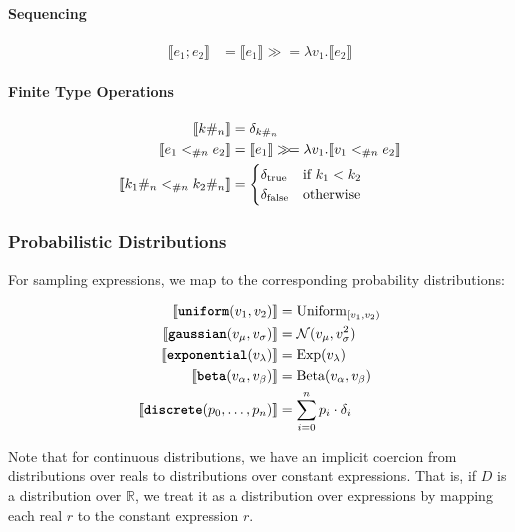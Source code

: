 \paragraph{Sequencing}
\begin{align*}
\llbracket e_1; e_2 \rrbracket &= \llbracket e_1 \rrbracket \gg\!= \lambda v_1. \llbracket e_2 \rrbracket
\end{align*}

\paragraph{Finite Type Operations}
\begin{align*}
\llbracket k\#_{n} \rrbracket &= \delta_{k\#_{n}} \\
\llbracket e_1 <_{\#{n}} e_2 \rrbracket &= \llbracket e_1 \rrbracket \gg\!= \lambda v_1. \llbracket v_1 <_{\#{n}} e_2 \rrbracket \\
\llbracket k_1\#_{n} <_{\#{n}} k_2\#_{n} \rrbracket &= \begin{cases}
    \delta_{\text{true}} & \text{if } k_1 < k_2 \\
    \delta_{\text{false}} & \text{otherwise}
\end{cases}
\end{align*}

\subsubsection{Probabilistic Distributions}

For sampling expressions, we map to the corresponding probability distributions:

\begin{align*}
\llbracket \text{\ttfamily\bfseries uniform}(v_1, v_2) \rrbracket &= \text{Uniform}_{[v_1, v_2)} \\
\llbracket \text{\ttfamily\bfseries gaussian}(v_\mu, v_\sigma) \rrbracket &= \mathcal{N}(v_\mu, v_\sigma^2) \\
\llbracket \text{\ttfamily\bfseries exponential}(v_\lambda) \rrbracket &= \text{Exp}(v_\lambda) \\
\llbracket \text{\ttfamily\bfseries beta}(v_\alpha, v_\beta) \rrbracket &= \text{Beta}(v_\alpha, v_\beta) \\
\llbracket \text{\ttfamily\bfseries discrete}(p_0, \ldots, p_n) \rrbracket &= \sum_{i=0}^n p_i \cdot \delta_i
\end{align*}

Note that for continuous distributions, we have an implicit coercion from distributions over reals to distributions over constant expressions. That is, if $D$ is a distribution over $\mathbb{R}$, we treat it as a distribution over expressions by mapping each real $r$ to the constant expression $r$.

